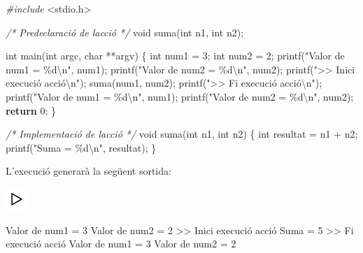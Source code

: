\documentclass[
]{book}
\newenvironment{Shaded}{\begin{snugshade}}{\end{snugshade}}
\newcommand{\CommentTok}[1]{\textcolor[rgb]{0.56,0.35,0.01}{\textit{#1}}}
\newcommand{\ControlFlowTok}[1]{\textcolor[rgb]{0.13,0.29,0.53}{\textbf{#1}}}
\newcommand{\DataTypeTok}[1]{\textcolor[rgb]{0.13,0.29,0.53}{#1}}
\newcommand{\DecValTok}[1]{\textcolor[rgb]{0.00,0.00,0.81}{#1}}
\newcommand{\ImportTok}[1]{#1}
\newcommand{\NormalTok}[1]{#1}
\newcommand{\PreprocessorTok}[1]{\textcolor[rgb]{0.56,0.35,0.01}{\textit{#1}}}
\newcommand{\SpecialCharTok}[1]{\textcolor[rgb]{0.00,0.00,0.00}{#1}}
\newcommand{\StringTok}[1]{\textcolor[rgb]{0.31,0.60,0.02}{#1}}
\begin{document}
\begin{Shaded}
\begin{Highlighting}[]
\PreprocessorTok{\#include }\ImportTok{\textless{}stdio.h\textgreater{}}

\CommentTok{/* Predeclaració de l\textquotesingle{}acció */}
\DataTypeTok{void}\NormalTok{ suma(}\DataTypeTok{int}\NormalTok{ n1, }\DataTypeTok{int}\NormalTok{ n2);}

\DataTypeTok{int}\NormalTok{ main(}\DataTypeTok{int}\NormalTok{ argc, }\DataTypeTok{char}\NormalTok{ **argv) \{}
    \DataTypeTok{int}\NormalTok{ num1 = }\DecValTok{3}\NormalTok{;}
    \DataTypeTok{int}\NormalTok{ num2 = }\DecValTok{2}\NormalTok{;}
\NormalTok{    printf(}\StringTok{"Valor de num1 = \%d}\SpecialCharTok{\textbackslash{}n}\StringTok{"}\NormalTok{, num1);}
\NormalTok{    printf(}\StringTok{"Valor de num2 = \%d}\SpecialCharTok{\textbackslash{}n}\StringTok{"}\NormalTok{, num2);}
\NormalTok{    printf(}\StringTok{"\textgreater{}\textgreater{} Inici execució acció}\SpecialCharTok{\textbackslash{}n}\StringTok{"}\NormalTok{);}
\NormalTok{    suma(num1, num2);}
\NormalTok{    printf(}\StringTok{"\textgreater{}\textgreater{} Fi execució acció}\SpecialCharTok{\textbackslash{}n}\StringTok{"}\NormalTok{);}
\NormalTok{    printf(}\StringTok{"Valor de num1 = \%d}\SpecialCharTok{\textbackslash{}n}\StringTok{"}\NormalTok{, num1);}
\NormalTok{    printf(}\StringTok{"Valor de num2 = \%d}\SpecialCharTok{\textbackslash{}n}\StringTok{"}\NormalTok{, num2);}
    \ControlFlowTok{return} \DecValTok{0}\NormalTok{;}
\NormalTok{\}   }

\CommentTok{/* Implementació de l\textquotesingle{}acció */}
\DataTypeTok{void}\NormalTok{ suma(}\DataTypeTok{int}\NormalTok{ n1, }\DataTypeTok{int}\NormalTok{ n2) \{}
    \DataTypeTok{int}\NormalTok{ resultat = n1 + n2;}
\NormalTok{    printf(}\StringTok{"Suma = \%d}\SpecialCharTok{\textbackslash{}n}\StringTok{"}\NormalTok{, resultat);}
\NormalTok{\}}
\end{Highlighting}
\end{Shaded}

L'execució generarà la següent sortida:

\includegraphics{./img/play.png}

\begin{Shaded}
\begin{Highlighting}[]
\NormalTok{Valor de num1 = }\DecValTok{3}
\NormalTok{Valor de num2 = }\DecValTok{2}
\NormalTok{\textgreater{}\textgreater{} Inici execució acció}
\NormalTok{Suma = }\DecValTok{5}
\NormalTok{\textgreater{}\textgreater{} Fi execució acció}
\NormalTok{Valor de num1 = }\DecValTok{3}
\NormalTok{Valor de num2 = }\DecValTok{2}
\end{Highlighting}
\end{Shaded}
\end{document}
